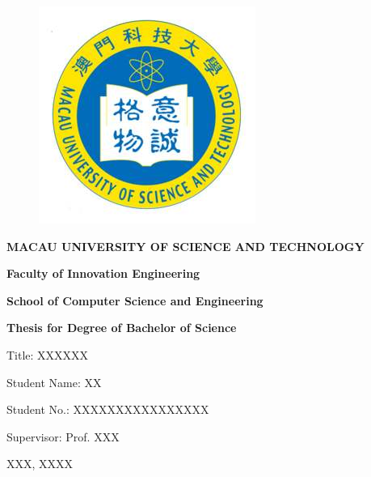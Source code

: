 \documentclass[12pt]{article}
\begin{document}
\begin{CJK*}{UTF8}{bsmi}

\thispagestyle{empty}
\begin{figure}[ht]

\centering
\includegraphics[scale=0.6]{must.jpg}

\end{figure}
\begin{center}
\LARGE
\textbf {MACAU UNIVERSITY OF SCIENCE AND TECHNOLOGY}
\end{center}
\par


\begin{center}
\linespread{2}

\normalsize \textbf {Faculty of Innovation Engineering}
\par

\normalsize \textbf {School of Computer Science and Engineering}
\par

\normalsize \textbf {Thesis for Degree of Bachelor of Science}
\par


\normalsize Title: XXXXXX
\par





\normalsize Student Name: XX
\par
\normalsize Student No.: XXXXXXXXXXXXXXXX
\par
\normalsize Supervisor: Prof. XXX
\par
\normalsize XXX, XXXX
\par

\end{center}
\setcounter{page}{1}




\newpage


\end{CJK*}
\end{document}
